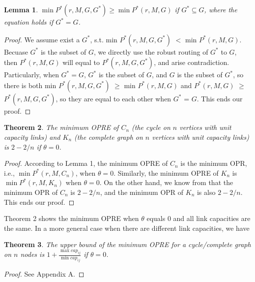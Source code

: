 \documentclass[conference]{IEEEtran}
\newtheorem{theorem}{Theorem}
\newtheorem{lemma}[theorem]{Lemma}
\begin{document}
\begin{lemma}
$\min P^*(r, M, G, G^*) \geq \min P^*(r, M, G)$ if $G^* \subseteq G$, where the equation holds if $G^* = G$.
\end{lemma}
\begin{proof}
We assume exist a $G^*$, s.t. min $P^*(r,M,G,G^*)$ $<$ min $P^*(r, M, G)$. Becuase $G^*$ is the subset of $G$, we directly
use the robust routing of $G^*$ to $G$, then $P^*(r, M, G)$ will equal to $P^*(r,M,G,G^*)$, and arise contradiction.
Particularly, when $G^* = G$, $G^*$ is the subset of $G$, and $G$ is the subset of $G^*$, so there is both
min $P^*(r,M,G,G^*)$ $\geq$ min $P^*(r, M, G)$ and $P^*(r, M ,G)$ $\geq$ $P^*(r, M, G, G^*)$, so they are equal to each other
when $G^*$ = $G$. This ends our proof.
\end{proof}

\begin{theorem}
The minimum OPRE of $C_n$ (the cycle on $n$ vertices with unit capacity links) and $K_n$ (the complete graph on $n$ vertices with unit capacity links) is $2-2/n$ if $\theta = 0$.
\end{theorem}
\begin{proof}
According to Lemma 1, the minimum OPRE of $C_n$ is the minimum OPR, i.e., $\min P^*(r, M, C_n)$, when $\theta = 0$. Similarly, the minimum OPRE of $K_n$ is $\min P^*(r, M, K_n)$ when $\theta = 0$. On the other hand, we know from \cite{networking:oblivious} that the minimum OPR of $C_n$ is $2-2/n$, and the minimum OPR of $K_n$ is also $2-2/n$. This ends our proof.
\end{proof}

Theorem 2 shows the minimum OPRE when $\theta$ equals 0 and all link capacities are the same. In a more general case when there are different link capacities, we have

\begin{theorem}
The upper bound of the minimum OPRE for a cycle/complete graph on $n$ nodes is $1 + \frac{\max cap_{ij}}{\min cap_{ij}}$ if $\theta = 0$.
\end{theorem}
\begin{proof}
See Appendix A.
\end{proof}
\end{document}
